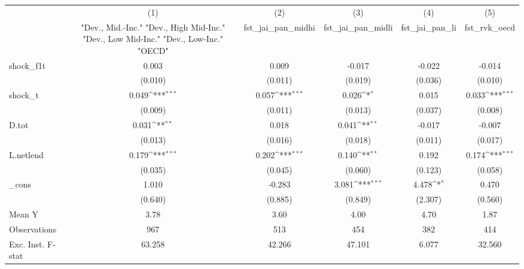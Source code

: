 {
\def\sym#1{\ifmmode^{#1}\else\(^{#1}\)\fi}
\begin{tabular}{l*{5}{c}}
\toprule
            &\multicolumn{1}{c}{(1)}&\multicolumn{1}{c}{(2)}&\multicolumn{1}{c}{(3)}&\multicolumn{1}{c}{(4)}&\multicolumn{1}{c}{(5)}\\
            &\multicolumn{1}{c}{ "Dev., Mid.-Inc." "Dev., High Mid-Inc." "Dev., Low Mid-Inc." "Dev., Low-Inc." "OECD" }&\multicolumn{1}{c}{fst\_jai\_pan\_midhi}&\multicolumn{1}{c}{fst\_jai\_pan\_midli}&\multicolumn{1}{c}{fst\_jai\_pan\_li}&\multicolumn{1}{c}{fst\_rvk\_oecd}\\
\midrule
shock\_f1t   &       0.003         &       0.009         &      -0.017         &      -0.022         &      -0.014         \\
            &     (0.010)         &     (0.011)         &     (0.019)         &     (0.036)         &     (0.010)         \\
\addlinespace
shock\_t     &       0.049\sym{***}&       0.057\sym{***}&       0.026\sym{*}  &       0.015         &       0.033\sym{***}\\
            &     (0.009)         &     (0.011)         &     (0.013)         &     (0.037)         &     (0.008)         \\
\addlinespace
D.tot       &       0.031\sym{**} &       0.018         &       0.041\sym{**} &      -0.017         &      -0.007         \\
            &     (0.013)         &     (0.016)         &     (0.018)         &     (0.011)         &     (0.017)         \\
\addlinespace
L.netlend   &       0.179\sym{***}&       0.202\sym{***}&       0.140\sym{**} &       0.192         &       0.174\sym{***}\\
            &     (0.035)         &     (0.045)         &     (0.060)         &     (0.123)         &     (0.058)         \\
\addlinespace
\_cons      &       1.010         &      -0.283         &       3.081\sym{***}&       4.478\sym{*}  &       0.470         \\
            &     (0.640)         &     (0.885)         &     (0.849)         &     (2.307)         &     (0.560)         \\
\midrule
Mean Y      &        3.78         &        3.60         &        4.00         &        4.70         &        1.87         \\
Observations&         967         &         513         &         454         &         382         &         414         \\
Exc. Inst. F-stat&      63.258         &      42.266         &      47.101         &       6.077         &      32.560         \\
\bottomrule
\end{tabular}
}
